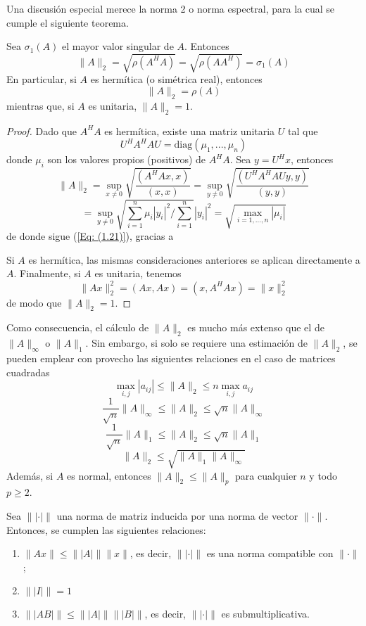 Una discusión especial merece la norma 2 o norma espectral, para la cual se cumple el siguiente teorema.

\begin{theorem}
    Sea $\sigma_1(A)$ el mayor valor singular de $A$. Entonces
    \begin{equation}
        \|A\|_2 = \sqrt{\rho (A^H A)} = \sqrt{\rho (A A^H)} = \sigma_1 (A)
        \label{Eq: (1.21)}
    \end{equation}
    En particular, si $A$ es hermítica (o simétrica real), entonces
    \begin{equation}
        \|A\|_2 = \rho(A)
        \label{Eq: (1.22)}
    \end{equation}
    mientras que, si $A$ es unitaria, $\|A\|_2 = 1$.
\end{theorem}

\begin{proof}
    Dado que $A^H A$ es hermítica, existe una matriz unitaria $U$ tal que
    \[ U^H A^H A U = \text{diag}(\mu_1,...,\mu_n) \]
    donde $\mu_i$ son los valores propios (positivos) de $A^H A$. Sea $y = U^H x$, entonces
    \[ \|A\|_2 = \sup_{x \neq 0}\sqrt{\frac{(A^H A x, x)}{(x, x)}} = \sup_{y \neq 0}\sqrt{\frac{(U^H A^H A Uy, y)}{(y,y)}} \]
    \[ = \sup_{y \neq 0}\sqrt{\sum_{i = 1}^{n} \mu_i |y_i|^2 / \sum_{i = 1}^{n}}|y_i|^2 = \sqrt{\max_{i = 1,...,n} |\mu_i| } \]
    de donde sigue (\ref{Eq: (1.21)}), gracias a %

    Si $A$ es hermítica, las mismas consideraciones anteriores se aplican directamente a $A$. Finalmente, si $A$ es unitaria, tenemos
    \[ \|Ax\|_2^2 = (Ax, Ax) = (x, A^H Ax) = \|x\|_2^2 \]
    de modo que $\|A\|_2 = 1$.
\end{proof}

Como consecuencia, el cálculo de $\|A\|_2$ es mucho más extenso que el de $\|A\|_\infty$ o $\|A\|_1$. Sin embargo, si solo se requiere una estimación de $\|A\|_2$, se pueden emplear con provecho las siguientes relaciones en el caso de matrices cuadradas
\[ \max_{i,j}{|a_{ij}|} \leq \|A\|_2 \leq n \max_{i,j}{a_{ij}} \]
\[ \frac{1}{\sqrt{n}} \|A\|_\infty \leq \|A\|_2 \leq \sqrt{n} \|A\|_\infty \]
\[ \frac{1}{\sqrt{n}} \|A\|_1 \leq \|A\|_2 \leq \sqrt{n} \|A\|_1 \]
\[ \|A\|_2 \leq \sqrt{\|A\|_1 \|A\|_\infty} \]
Además, si $A$ es normal, entonces $\|A\|_2 \leq \|A\|_p$ para cualquier $n$ y todo $ p \geq 2 $.

\begin{theorem}
    Sea $ \||\cdot|\| $ una norma de matriz inducida por una norma de vector $\| \cdot \|$. Entonces, se cumplen las siguientes relaciones:
    \begin{enumerate}
        \item $ \|Ax\| \leq \||A|\|  \|x\| $, es decir, $ \||\cdot|\| $ es una norma compatible con $\|\cdot\|$;
        \item $\||I|\| = 1 $
        \item $\||AB|\| \leq \||A|\| \||B|\|$, es decir, $ \||\cdot|\| $ es submultiplicativa.
    \end{enumerate}
\end{theorem}

